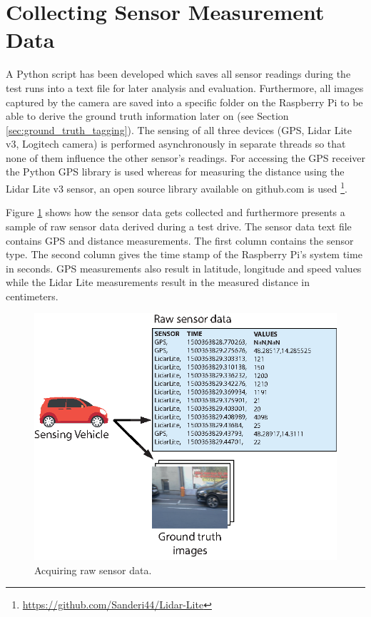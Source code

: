 \section{Collecting Sensor Measurement Data}
\label{sec:sensor_measurement_collection}

A Python script has been developed which saves all sensor readings during the test runs into a text file for later analysis and evaluation. Furthermore, all images captured by the camera are saved into a specific folder on the Raspberry Pi to be able to derive the ground truth information later on (see Section \ref{sec:ground_truth_tagging}).
The sensing of all three devices (GPS, Lidar Lite v3, Logitech camera) is performed asynchronously in separate threads so that none of them influence the other sensor's readings. For accessing the GPS receiver the Python GPS library is used whereas for measuring the distance using the Lidar Lite v3 sensor, an open source library available on github.com is used \footnote{\url{https://github.com/Sanderi44/Lidar-Lite}}. 

Figure \ref{fig:sample_sensor_trace} shows how the sensor data gets collected and furthermore presents a sample of raw sensor data derived during a test drive. The sensor data text file contains GPS and distance measurements. The first column contains the sensor type. The second column gives the time stamp of the Raspberry Pi's system time in seconds. GPS measurements also result in latitude, longitude and speed values while the Lidar Lite measurements result in the measured distance in centimeters.


\begin{figure}
	\centering
	\includegraphics{img/obtaining-raw-dataset.eps}
	\caption{Acquiring raw sensor data.}
	\label{fig:sample_sensor_trace}
\end{figure}



